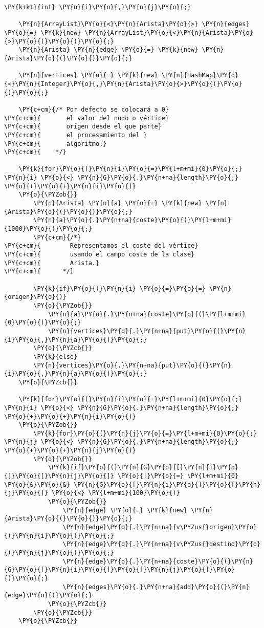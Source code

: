 \begin{Verbatim}[commandchars=\\\{\}]
    \PY{k+kt}{int} \PY{n}{i}\PY{o}{,}\PY{n}{j}\PY{o}{;}

    \PY{n}{ArrayList}\PY{o}{<}\PY{n}{Arista}\PY{o}{>} \PY{n}{edges} \PY{o}{=} \PY{k}{new} \PY{n}{ArrayList}\PY{o}{<}\PY{n}{Arista}\PY{o}{>}\PY{o}{(}\PY{o}{)}\PY{o}{;}
    \PY{n}{Arista} \PY{n}{edge} \PY{o}{=} \PY{k}{new} \PY{n}{Arista}\PY{o}{(}\PY{o}{)}\PY{o}{;}

    \PY{n}{vertices} \PY{o}{=} \PY{k}{new} \PY{n}{HashMap}\PY{o}{<}\PY{n}{Integer}\PY{o}{,}\PY{n}{Arista}\PY{o}{>}\PY{o}{(}\PY{o}{)}\PY{o}{;}

    \PY{c+cm}{/* Por defecto se colocará a 0}
\PY{c+cm}{       el valor del nodo o vértice}
\PY{c+cm}{       origen desde el que parte}
\PY{c+cm}{       el procesamiento del }
\PY{c+cm}{       algoritmo.}
\PY{c+cm}{    */}
	
    \PY{k}{for}\PY{o}{(}\PY{n}{i}\PY{o}{=}\PY{l+m+mi}{0}\PY{o}{;} \PY{n}{i} \PY{o}{<} \PY{n}{G}\PY{o}{.}\PY{n+na}{length}\PY{o}{;} \PY{o}{+}\PY{o}{+}\PY{n}{i}\PY{o}{)}
	\PY{o}{\PYZob{}}
	    \PY{n}{Arista} \PY{n}{a} \PY{o}{=} \PY{k}{new} \PY{n}{Arista}\PY{o}{(}\PY{o}{)}\PY{o}{;}
	    \PY{n}{a}\PY{o}{.}\PY{n+na}{coste}\PY{o}{(}\PY{l+m+mi}{1000}\PY{o}{)}\PY{o}{;} 
	    \PY{c+cm}{/*}
\PY{c+cm}{	      Representamos el coste del vértice}
\PY{c+cm}{	      usando el campo coste de la clase}
\PY{c+cm}{	      Arista.}
\PY{c+cm}{	    */}

	    \PY{k}{if}\PY{o}{(}\PY{n}{i} \PY{o}{=}\PY{o}{=} \PY{n}{origen}\PY{o}{)}
		\PY{o}{\PYZob{}}
		    \PY{n}{a}\PY{o}{.}\PY{n+na}{coste}\PY{o}{(}\PY{l+m+mi}{0}\PY{o}{)}\PY{o}{;}
		    \PY{n}{vertices}\PY{o}{.}\PY{n+na}{put}\PY{o}{(}\PY{n}{i}\PY{o}{,}\PY{n}{a}\PY{o}{)}\PY{o}{;}
		\PY{o}{\PYZcb{}}
	    \PY{k}{else}
		\PY{n}{vertices}\PY{o}{.}\PY{n+na}{put}\PY{o}{(}\PY{n}{i}\PY{o}{,}\PY{n}{a}\PY{o}{)}\PY{o}{;}
	\PY{o}{\PYZcb{}}

    \PY{k}{for}\PY{o}{(}\PY{n}{i}\PY{o}{=}\PY{l+m+mi}{0}\PY{o}{;} \PY{n}{i} \PY{o}{<} \PY{n}{G}\PY{o}{.}\PY{n+na}{length}\PY{o}{;} \PY{o}{+}\PY{o}{+}\PY{n}{i}\PY{o}{)}
	\PY{o}{\PYZob{}}
	    \PY{k}{for}\PY{o}{(}\PY{n}{j}\PY{o}{=}\PY{l+m+mi}{0}\PY{o}{;} \PY{n}{j} \PY{o}{<} \PY{n}{G}\PY{o}{.}\PY{n+na}{length}\PY{o}{;} \PY{o}{+}\PY{o}{+}\PY{n}{j}\PY{o}{)}
		\PY{o}{\PYZob{}}
		    \PY{k}{if}\PY{o}{(}\PY{n}{G}\PY{o}{[}\PY{n}{i}\PY{o}{]}\PY{o}{[}\PY{n}{j}\PY{o}{]} \PY{o}{!}\PY{o}{=} \PY{l+m+mi}{0} \PY{o}{&}\PY{o}{&} \PY{n}{G}\PY{o}{[}\PY{n}{i}\PY{o}{]}\PY{o}{[}\PY{n}{j}\PY{o}{]} \PY{o}{<} \PY{l+m+mi}{100}\PY{o}{)}
			\PY{o}{\PYZob{}}
			    \PY{n}{edge} \PY{o}{=} \PY{k}{new} \PY{n}{Arista}\PY{o}{(}\PY{o}{)}\PY{o}{;}
			    \PY{n}{edge}\PY{o}{.}\PY{n+na}{v\PYZus{}origen}\PY{o}{(}\PY{n}{i}\PY{o}{)}\PY{o}{;}
			    \PY{n}{edge}\PY{o}{.}\PY{n+na}{v\PYZus{}destino}\PY{o}{(}\PY{n}{j}\PY{o}{)}\PY{o}{;}
			    \PY{n}{edge}\PY{o}{.}\PY{n+na}{coste}\PY{o}{(}\PY{n}{G}\PY{o}{[}\PY{n}{i}\PY{o}{]}\PY{o}{[}\PY{n}{j}\PY{o}{]}\PY{o}{)}\PY{o}{;}
			    \PY{n}{edges}\PY{o}{.}\PY{n+na}{add}\PY{o}{(}\PY{n}{edge}\PY{o}{)}\PY{o}{;}
			\PY{o}{\PYZcb{}}
		\PY{o}{\PYZcb{}}
	\PY{o}{\PYZcb{}}


\end{Verbatim}
